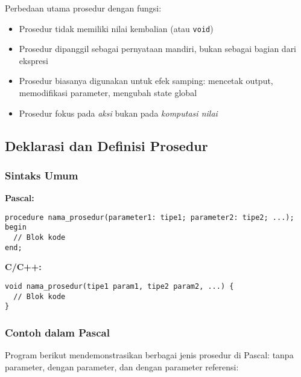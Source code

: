 \documentclass[../main.tex]{subfiles}
\begin{document}
Perbedaan utama prosedur dengan fungsi:
\begin{itemize}
  \item Prosedur tidak memiliki nilai kembalian (atau \texttt{void})
  \item Prosedur dipanggil sebagai pernyataan mandiri, bukan sebagai bagian dari ekspresi
  \item Prosedur biasanya digunakan untuk efek samping: mencetak output, memodifikasi parameter, mengubah state global
  \item Prosedur fokus pada \emph{aksi} bukan pada \emph{komputasi nilai}
\end{itemize}

\subsection{Deklarasi dan Definisi Prosedur}
\subsubsection{Sintaks Umum}
\textbf{Pascal:}
\begin{verbatim}
procedure nama_prosedur(parameter1: tipe1; parameter2: tipe2; ...);
begin
  // Blok kode
end;
\end{verbatim}

\textbf{C/C++:}
\begin{verbatim}
void nama_prosedur(tipe1 param1, tipe2 param2, ...) {
  // Blok kode
}
\end{verbatim}

\subsubsection{Contoh dalam Pascal}

Program berikut mendemonstrasikan berbagai jenis prosedur di Pascal: tanpa parameter, dengan parameter, dan dengan parameter referensi:
\end{document}
